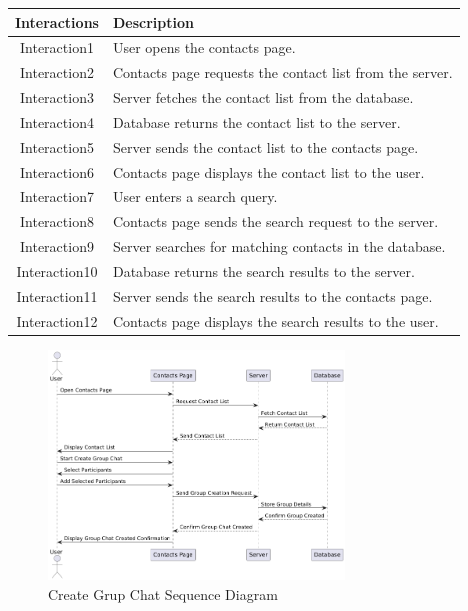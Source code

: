 \begin{longtable}{|c|p{10cm}|}
    \hline
    \textbf{Interactions} & \textbf{Description} \\
    \hline
    Interaction1 & User opens the contacts page. \\
    \hline
    Interaction2 & Contacts page requests the contact list from the server. \\
    \hline
    Interaction3 & Server fetches the contact list from the database. \\
    \hline
    Interaction4 & Database returns the contact list to the server. \\
    \hline
    Interaction5 & Server sends the contact list to the contacts page. \\
    \hline
    Interaction6 & Contacts page displays the contact list to the user. \\
    \hline
    Interaction7 & User enters a search query. \\
    \hline
    Interaction8 & Contacts page sends the search request to the server. \\
    \hline
    Interaction9 & Server searches for matching contacts in the database. \\
    \hline
    Interaction10 & Database returns the search results to the server. \\
    \hline
    Interaction11 & Server sends the search results to the contacts page. \\
    \hline
    Interaction12 & Contacts page displays the search results to the user. \\
    \hline
\end{longtable}
\newpage
\begin{figure}[h]
    \centering
    \includegraphics[width=0.7\textwidth]{images/create_grup.png} %
    \caption{Create Grup Chat Sequence Diagram}
    \label{fig:example}
\end{figure}


